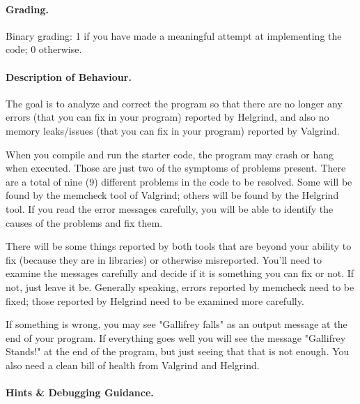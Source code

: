 \documentclass[a4paper]{report}
\begin{document}
\paragraph{Grading.} Binary grading: 1 if you have made a meaningful attempt at implementing the code; 0 otherwise.

\paragraph{Description of Behaviour.} The goal is to analyze and correct the program so that there are no longer any errors (that you can fix in your program) reported by Helgrind, and also no memory leaks/issues (that you can fix in your program) reported by Valgrind.

When you compile and run the starter code, the program may crash or hang when executed. Those are just two of the symptoms of problems present. There are a total of nine (9) different problems in the code to be resolved. Some will be found by the memcheck tool of Valgrind; others will be found by the Helgrind tool. If you read the error messages carefully, you will be able to identify the causes of the problems and fix them.

There will be some things reported by both tools that are beyond your ability to fix (because they are in libraries) or otherwise misreported. You'll need to examine the messages carefully and decide if it is something you can fix or not. If not, just leave it be. Generally speaking, errors reported by memcheck need to be fixed; those reported by Helgrind need to be examined more carefully.

If something is wrong, you may see "Gallifrey falls" as an output message at the end of your program. If everything goes well you will see the message "Gallifrey Stands!" at the end of the program, but just seeing that that is not enough. You also need a clean bill of health from Valgrind and Helgrind.

\paragraph{Hints \& Debugging Guidance.}
\end{document}
